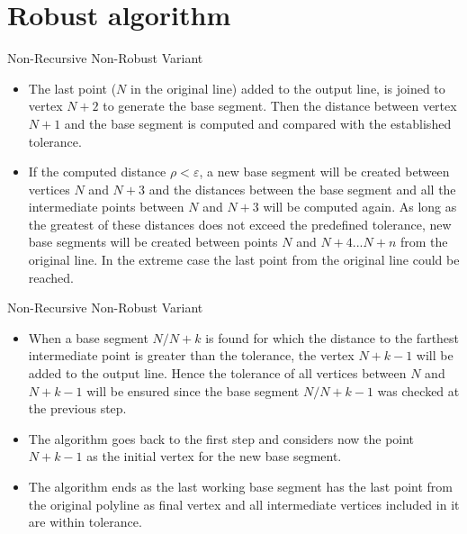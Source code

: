 \documentclass[10pt]{beamer}
\begin{document}
\section{Robust algorithm}

\begin{frame}{Non-Recursive Non-Robust Variant}
	\begin{itemize}
		\item The last point ($N$ in the original line) added to the output line,
			  is joined to vertex $N+2$ to generate the base segment. 
			  Then the distance between vertex $N+1$ and the base segment 
			  is computed and compared with the established tolerance.
		\item If the computed distance $\rho < \varepsilon$, a new
			  base segment will be created between vertices $N$ and $N + 3$ and
			  the distances between the base segment and all the intermediate
			  points between $N$ and $N + 3$ will be computed again. As long as 
			  the greatest of these distances does not exceed the predefined
			  tolerance, new base segments will be created between points $N$
			  and $N + 4...N + n$ from the original line. In the extreme case the
			  last point from the original line could be reached.
	\end{itemize}

\end{frame}

\begin{frame}{Non-Recursive Non-Robust Variant}
	\begin{itemize}
		\item When a base segment $N/N + k$ is found for which the distance to
			  the farthest intermediate point is greater than the tolerance,
			  the vertex $N + k - 1$ will be added to the output line. Hence the
	          tolerance of all vertices between $N$ and $N + k - 1$ will be ensured
			  since the base segment $N/N + k - 1$ was checked at the previous
			  step.
		\item The algorithm goes back to the first step and considers now the
			  point $N + k - 1$ as the initial vertex for the new base segment.
		\item The algorithm ends as the last working base segment has the
			  last point from the original polyline as final vertex and all
			  intermediate vertices included in it are within tolerance.
	\end{itemize}

\end{frame}
\end{document}
